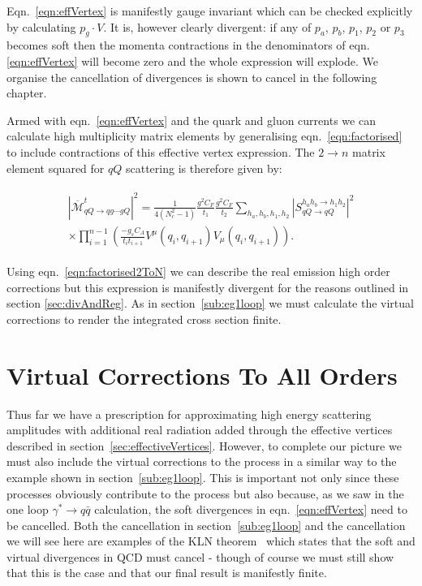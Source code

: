 	Eqn.~\eqref{eqn:effVertex} is manifestly gauge invariant which can be checked explicitly by
	calculating $p_g\cdot V$.  It is, however clearly divergent:  if any of $p_a$, $p_b$, $p_1$,
	$p_2$ or $p_3$ becomes soft then the momenta contractions in the denominators of eqn.
	\eqref{eqn:effVertex} will become zero and the whole expression will explode.  We organise
	the cancellation of divergences is shown to cancel in the following chapter.

	Armed with eqn.~\eqref{eqn:effVertex} and the quark and gluon currents we can calculate
	high multiplicity matrix elements by generalising eqn.~\eqref{eqn:factorised} to include
	contractions of this effective vertex expression.  The $2\rightarrow n$ matrix element
	squared for $qQ$ scattering is therefore given by:

	\begin{align}
	\begin{split}
		|\overline{\mathcal{M}}^t_{qQ\rightarrow qg\cdots gQ}|^2 = \frac{1}{4(N_c^2-1)}
		\frac{g^2C_F}{t_1}\frac{g^2C_F}{t_2} \sum_{h_a, h_b, h_1, h_2}
		|S_{qQ\rightarrow qQ}^{h_ah_b\rightarrow h_1h_2}|^2\\
		\times\prod_{i=1}^{n-1}\left(\frac{-g_sC_A}{t_it_{i+1}}V^\mu(q_i, q_{i+1})V_\mu(q_i, q_{i+1})\right).
		\label{eqn:factorised2ToN}
	\end{split}
	\end{align}

	Using eqn.~\eqref{eqn:factorised2ToN} we can describe the real emission high order
	corrections but this expression is manifestly divergent for the reasons outlined in
	section \ref{sec:divAndReg}.  As in section~\ref{sub:eg1loop} we must calculate the
	virtual corrections to render the integrated cross section finite.

\section{Virtual Corrections To All Orders}
	\label{sub:virtuals}

	Thus far we have a prescription for approximating high energy scattering amplitudes with additional
	real radiation added through the effective vertices described in section~\eqref{sec:effectiveVertices}.
	However, to complete our picture we must also include the virtual corrections to the process in
	a similar way to the example shown in section~\eqref{sub:eg1loop}.  This is important
	not only since these processes obviously contribute to the process but also because, as we saw in
	the one loop $\gamma^*\to q\bar{q}$ calculation, the soft divergences in eqn.~\eqref{eqn:effVertex}
	need to be cancelled.  Both the cancellation in section~\eqref{sub:eg1loop} and the cancellation
	we will see here are examples of the KLN theorem~\cite{mutaBook} which states that the soft and virtual
	divergences in QCD must cancel - though of course we must still show that this is the case and that our
	final result is manifestly finite.

